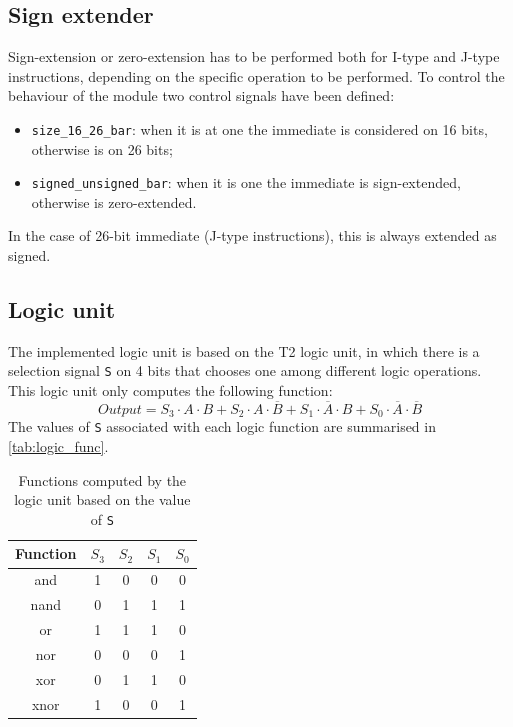 \subsection{Sign extender}

Sign-extension or zero-extension has to be performed both for I-type and J-type instructions, depending on the specific operation to be performed. 
To control the behaviour of the module two control signals have been defined:
\begin{itemize}
    \item \texttt{size\_16\_26\_bar}: when it is at one  the immediate is considered on 16 bits, otherwise is on 26 bits;
    \item \texttt{signed\_unsigned\_bar}: when it is one the immediate is sign-extended, otherwise is zero-extended.
\end{itemize}
In the case of 26-bit immediate (J-type instructions), this is always extended as signed.

\subsection{Logic unit}

The implemented logic unit is based on the T2 logic unit, in which there is a selection signal \texttt{S} on 4 bits that chooses one among different logic operations. 
This logic unit only computes the following function:
\[
Output = S_3 \cdot A \cdot B + S_2 \cdot A \cdot \overline{B} + S_1 \cdot \overline{A} \cdot B + S_0 \cdot \overline{A} \cdot \overline{B} 
\]
The values of \texttt{S} associated with each logic function are summarised in \autoref{tab:logic_func}.

\begin{table}[]
    \centering
    \begin{tabular}{|c|c|c|c|c|}
        \hline
         Function & $S_3$ & $S_2$ & $S_1$ & $S_0$\\
         \hline
          and & 1 & 0 & 0 & 0 \\
         nand & 0 & 1 & 1  & 1\\
         or & 1 & 1 & 1 & 0\\
         nor & 0 & 0 & 0  & 1\\
         xor & 0 & 1 & 1 & 0 \\
         xnor & 1 & 0 & 0 & 1 \\
         \hline 
    \end{tabular}
    \caption{Functions computed by the logic unit based on the value of \texttt{S}}
    \label{tab:logic_func}
\end{table}

